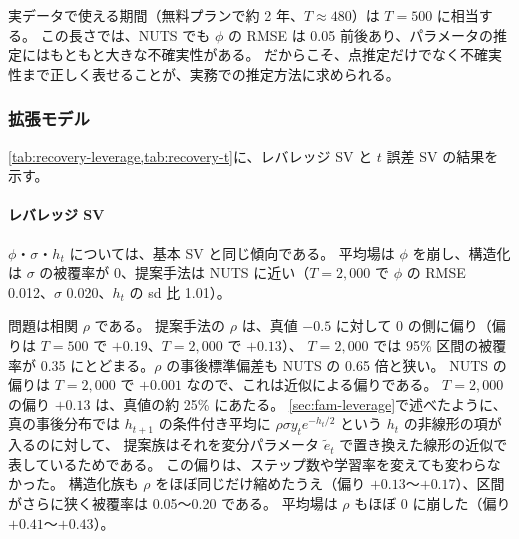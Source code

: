 実データで使える期間（無料プランで約 2 年、$T \approx 480$）は $T = 500$ に相当する。
この長さでは、NUTS でも $\phi$ の RMSE は 0.05 前後あり、パラメータの推定にはもともと大きな不確実性がある。
だからこそ、点推定だけでなく不確実性まで正しく表せることが、実務での推定方法に求められる。

\subsubsection{拡張モデル}

\cref{tab:recovery-leverage,tab:recovery-t}に、レバレッジ SV と $t$ 誤差 SV の結果を示す。

\begin{table}[tbp]
  \centering
  \caption{真値の復元精度（S1、レバレッジ SV、$\mu = 0$、$\phi = 0.97$、$\sigma = 0.15$、$\rho = -0.5$、各条件 20 本）。見方は\cref{tab:recovery}と同じ。}
  \label{tab:recovery-leverage}
  \small
  \setlength{\tabcolsep}{3.5pt}
  
\end{table}

\begin{table}[tbp]
  \centering
  \caption{真値の復元精度（S1、$t$ 誤差 SV、$\mu = 0$、$\phi = 0.97$、$\sigma = 0.15$、$\nu = 8$、各条件 20 本）。見方は\cref{tab:recovery}と同じ。}
  \label{tab:recovery-t}
  \small
  \setlength{\tabcolsep}{3.5pt}
  
\end{table}

\paragraph{レバレッジ SV}
$\phi$・$\sigma$・$h_t$ については、基本 SV と同じ傾向である。
平均場は $\phi$ を崩し、構造化は $\sigma$ の被覆率が 0、提案手法は NUTS に近い（$T = 2{,}000$ で $\phi$ の RMSE 0.012、$\sigma$ 0.020、$h_t$ の sd 比 1.01）。

問題は相関 $\rho$ である。
提案手法の $\rho$ は、真値 $-0.5$ に対して 0 の側に偏り（偏りは $T = 500$ で $+0.19$、$T = 2{,}000$ で $+0.13$）、
$T = 2{,}000$ では 95\% 区間の被覆率が 0.35 にとどまる。$\rho$ の事後標準偏差も NUTS の 0.65 倍と狭い。
NUTS の偏りは $T = 2{,}000$ で $+0.001$ なので、これは近似による偏りである。
$T = 2{,}000$ の偏り $+0.13$ は、真値の約 25\% にあたる。
\cref{sec:fam-leverage}で述べたように、真の事後分布では $h_{t+1}$ の条件付き平均に $\rho\sigma y_t e^{-h_t/2}$ という $h_t$ の非線形の項が入るのに対して、
提案族はそれを変分パラメータ $\tilde e_t$ で置き換えた線形の近似で表しているためである。
この偏りは、ステップ数や学習率を変えても変わらなかった。
構造化族も $\rho$ をほぼ同じだけ縮めたうえ（偏り $+0.13$〜$+0.17$）、区間がさらに狭く被覆率は 0.05〜0.20 である。
平均場は $\rho$ もほぼ 0 に崩した（偏り $+0.41$〜$+0.43$）。


